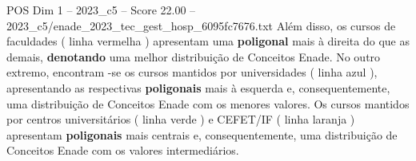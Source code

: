 \begin{textsample}{POS Dim 1 – 2023\_c5 – Score 22.00 – 2023\_c5/enade\_2023\_tec\_gest\_hosp\_6095fc7676.txt}
Além disso, os cursos de faculdades ( linha vermelha ) apresentam uma \textbf{poligonal} mais à direita do que as demais, \textbf{denotando} uma melhor distribuição de Conceitos Enade.
No outro extremo, encontram -se os cursos mantidos por universidades ( linha azul ), apresentando as respectivas \textbf{poligonais} mais à esquerda e, consequentemente, uma distribuição de Conceitos Enade com os menores valores.
Os cursos mantidos por centros universitários ( linha verde ) e CEFET/IF ( linha laranja ) apresentam \textbf{poligonais} mais centrais e, consequentemente, uma distribuição de Conceitos Enade com os valores intermediários.

\end{textsample}
